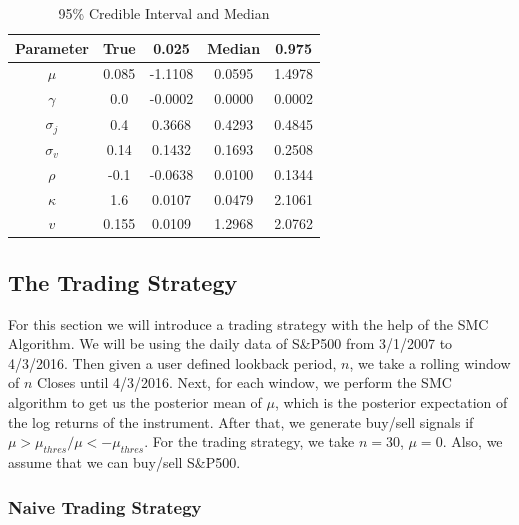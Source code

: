 \documentclass[12pt]{article}
\theoremstyle{definition}
\begin{document}
\begin{table}
\centering
\begin{tabular}{|c c c c c|} 
 \hline
 Parameter & True & 0.025 & Median & 0.975 \\
 \hline
 $\mu$ & 0.085 & -1.1108 & 0.0595 &1.4978 \\
 $\gamma$ & 0.0 & -0.0002 & 0.0000 & 0.0002 \\
 $\sigma_{j}$ & 0.4 & 0.3668 & 0.4293 & 0.4845\\
 $\sigma_{v}$ & 0.14 & 0.1432 & 0.1693 &0.2508\\
 $\rho$ & -0.1 & -0.0638 & 0.0100 & 0.1344\\
 $\kappa$ & 1.6 & 0.0107 & 0.0479 & 2.1061\\
 $v$ & 0.155& 0.0109 & 1.2968 & 2.0762\\ 
 \hline
\end{tabular}
\caption{95\% Credible Interval and Median}
\label{table:1}
\end{table}
\subsection{The Trading Strategy}
For this section we will introduce a trading strategy with the help of the SMC Algorithm. We will be using the daily data of S\&P500 from 3/1/2007 to 4/3/2016. Then given a user defined lookback period, $n$, we take a rolling window of $n$ Closes until 4/3/2016. Next, for each window, we perform the SMC algorithm to get us the posterior mean of $\mu$, which is the posterior expectation of the log returns of the instrument. After that, we generate buy/sell signals if $\mu>\mu_{thres}/\mu<-\mu_{thres}$. For the trading strategy, we take $n=30$, $\mu=0$. Also, we assume that we can buy/sell S\&P500. 

\subsubsection{Naive Trading Strategy}
\end{document}
